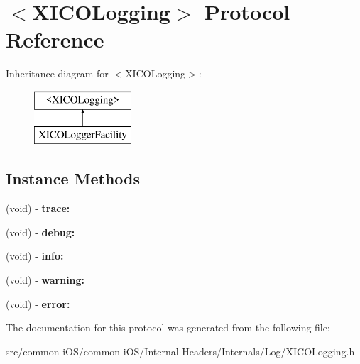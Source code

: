 \hypertarget{protocol_x_i_c_o_logging-p}{}\section{$<$X\+I\+C\+O\+Logging$>$ Protocol Reference}
\label{protocol_x_i_c_o_logging-p}
Inheritance diagram for $<$X\+I\+C\+O\+Logging$>$\+:\begin{figure}[H]
\begin{center}
\leavevmode
\includegraphics[height=2.000000cm]{protocol_x_i_c_o_logging-p}
\end{center}
\end{figure}
\subsection*{Instance Methods}
\begin{DoxyCompactItemize}
\item 
\hypertarget{protocol_x_i_c_o_logging-p_ad0d86a659045812ca9cf93fbde99d31c}{}\label{protocol_x_i_c_o_logging-p_ad0d86a659045812ca9cf93fbde99d31c} 
(void) -\/ {\bfseries trace\+:}
\item 
\hypertarget{protocol_x_i_c_o_logging-p_a45f7b462eeed776896881e60f2a815ec}{}\label{protocol_x_i_c_o_logging-p_a45f7b462eeed776896881e60f2a815ec} 
(void) -\/ {\bfseries debug\+:}
\item 
\hypertarget{protocol_x_i_c_o_logging-p_a9ad8d8648c012998b962a2b46d2f6eec}{}\label{protocol_x_i_c_o_logging-p_a9ad8d8648c012998b962a2b46d2f6eec} 
(void) -\/ {\bfseries info\+:}
\item 
\hypertarget{protocol_x_i_c_o_logging-p_a33e714e6068da66cc25714d6d6a6a022}{}\label{protocol_x_i_c_o_logging-p_a33e714e6068da66cc25714d6d6a6a022} 
(void) -\/ {\bfseries warning\+:}
\item 
\hypertarget{protocol_x_i_c_o_logging-p_a3d98513684caedd0a9e25e143b3d1321}{}\label{protocol_x_i_c_o_logging-p_a3d98513684caedd0a9e25e143b3d1321} 
(void) -\/ {\bfseries error\+:}
\end{DoxyCompactItemize}


The documentation for this protocol was generated from the following file\+:\begin{DoxyCompactItemize}
\item 
src/common-\/i\+O\+S/common-\/i\+O\+S/\+Internal Headers/\+Internals/\+Log/X\+I\+C\+O\+Logging.\+h\end{DoxyCompactItemize}
